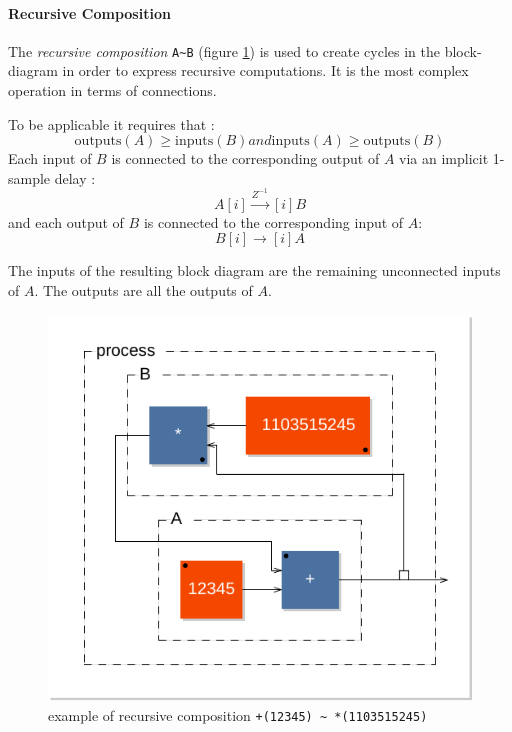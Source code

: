 \paragraph{Recursive Composition}
The \emph{recursive composition} \lstinline'A~B' (figure \ref{figure-rec1}) is used to create cycles in the block-diagram in order to express recursive computations. It is the most complex operation in terms of connections.

To be applicable it requires that :
\begin{equation}
\mathrm{outputs}(A) \geq \mathrm{inputs}(B) and \mathrm{inputs}(A) \geq \mathrm{outputs}(B)                                                                                               \end{equation}
Each input of $B$ is connected to the corresponding output of $A$ via an implicit 1-sample delay : 
\begin{equation}
A[i]\stackrel{Z^{-1}}{\rightarrow}[i]B
\end{equation} 
and each output of $B$ is connected to the corresponding input of $A$:
\begin{equation}
B[i]\rightarrow [i]A
\end{equation} 

The inputs of the resulting block diagram are the remaining unconnected inputs of $A$. The outputs are all the outputs of $A$.
 
\begin{figure}[h]
\centering 
\includegraphics[scale=0.7]{images/rec1} 
\caption{example of recursive composition \lstinline'+(12345) ~ *(1103515245)'}  
\label{figure-rec1}
\end{figure}

